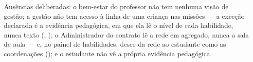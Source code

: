\medskip
{\small\color{unooMuted}Ausências deliberadas: o bem-estar do professor não
tem nenhuma visão de gestão; a gestão não tem acesso à linha de uma criança
nas missões --- a exceção declarada é a evidência pedagógica, em que ela lê o
nível de cada habilidade, nunca texto (, ); o Administrador do
contrato lê a rede em agregado, nunca a sala de aula --- e, no painel de
habilidades, desce da rede ao estudante como as coordenações (); e o
estudante não vê a própria evidência pedagógica.}
